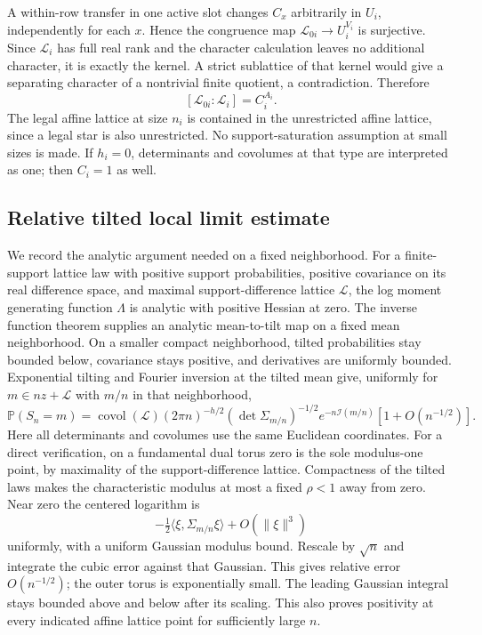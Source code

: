 \documentclass[11pt]{article}
\newcommand{\Prob}{\mathbb P}
\newcommand{\covol}{\operatorname{covol}}
\begin{document}
A within-row transfer in one active slot changes $C_x$ arbitrarily in $U_i$, independently for each $x$. Hence the congruence map $\mathcal L_{0i}\to U_i^{V_i}$ is surjective. Since $\mathcal L_i$ has full real rank and the character calculation leaves no additional character, it is exactly the kernel. A strict sublattice of that kernel would give a separating character of a nontrivial finite quotient, a contradiction. Therefore
\begin{equation}\label{eq:localindex}
 [\mathcal L_{0i}:\mathcal L_i]=C_i^{A_i}.
\end{equation}
The legal affine lattice at size $n_i$ is contained in the unrestricted affine lattice, since a legal star is also unrestricted. No support-saturation assumption at small sizes is made. If $h_i=0$, determinants and covolumes at that type are interpreted as one; then $C_i=1$ as well.

\subsection*{Relative tilted local limit estimate}
We record the analytic argument needed on a fixed neighborhood. For a finite-support lattice law with positive support probabilities, positive covariance on its real difference space, and maximal support-difference lattice $\mathcal L$, the log moment generating function $\Lambda$ is analytic with positive Hessian at zero. The inverse function theorem supplies an analytic mean-to-tilt map on a fixed mean neighborhood. On a smaller compact neighborhood, tilted probabilities stay bounded below, covariance stays positive, and derivatives are uniformly bounded. Exponential tilting and Fourier inversion at the tilted mean give, uniformly for $m\in nz+\mathcal L$ with $m/n$ in that neighborhood,
\begin{equation}\label{eq:llt}
 \Prob(S_n=m)=\covol(\mathcal L)(2\pi n)^{-h/2}
 (\det\Sigma_{m/n})^{-1/2}e^{-n\mathcal I(m/n)}
 [1+O(n^{-1/2})].
\end{equation}
Here all determinants and covolumes use the same Euclidean coordinates. For a direct verification, on a fundamental dual torus zero is the sole modulus-one point, by maximality of the support-difference lattice. Compactness of the tilted laws makes the characteristic modulus at most a fixed $\rho<1$ away from zero. Near zero the centered logarithm is
\[
 -\tfrac12\langle\xi,\Sigma_{m/n}\xi\rangle+O(\|\xi\|^3)
\]
uniformly, with a uniform Gaussian modulus bound. Rescale by $\sqrt n$ and integrate the cubic error against that Gaussian. This gives relative error $O(n^{-1/2})$; the outer torus is exponentially small. The leading Gaussian integral stays bounded above and below after its scaling. This also proves positivity at every indicated affine lattice point for sufficiently large $n$.
\end{document}
